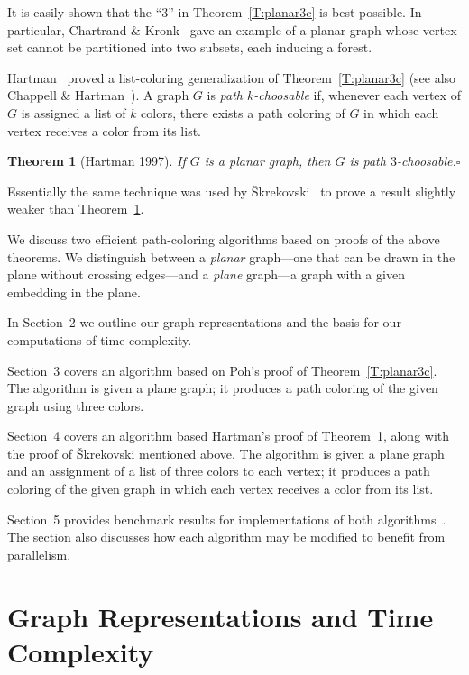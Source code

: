 \documentclass[12pt,letterpaper]{article}
\theoremstyle{plain}
\newtheorem{theorem}[lemma]{Theorem}         %
\theoremstyle{definition}
\theoremstyle{break}
\newcommand{\ggcqedsymbol}{$\square$}
\newcommand{\ggcqed}{\hbox{}\nobreak\hbox{\quad\ggcqedsymbol}}
\newcommand{\ggcnopf}{\ggcqed}
\newcommand{\defterm}[1]{\emph{#1}} %
\begin{document}
It is easily shown that the ``$3$'' in Theorem~\ref{T:planar3c}
is best possible.
In particular, Chartrand \& Kronk~\cite[Section~3]{ChKr1969}
gave an example of a planar graph whose vertex set cannot be partitioned
into two subsets, each inducing a forest.

Hartman~\cite[Thm.~4.1]{Har1997}
proved a list-coloring generalization of Theorem~\ref{T:planar3c}
(see also Chappell \& Hartman~\cite[Thm.~2.1]{ChHa2017prep}).
A graph $G$ is \defterm{path $k$-choosable} if,
whenever each vertex of $G$ is assigned a list of $k$ colors,
there exists a path coloring of $G$ in which each vertex receives
a color from its list.

\begin{theorem}[Hartman 1997]\label{T:planar3}
If $G$ is a planar graph,
then $G$ is path $3$-choosable.\ggcnopf\end{theorem}

Essentially the same technique was used by
\v{S}krekovski~\cite[Thm.~2.2b]{Skr1999}
to prove a result slightly weaker than Theorem~\ref{T:planar3}.


\medskip

We discuss two efficient path-coloring algorithms
based on proofs of the above theorems.
We distinguish between a \defterm{planar} graph---one that
can be drawn in the plane without crossing edges---and
a \defterm{plane} graph---a graph with a given embedding
in the plane.

In Section~2 we outline our graph representations
and the basis for our computations of time complexity.

Section~3 covers an algorithm
based on Poh's proof of Theorem~\ref{T:planar3c}.
The algorithm is given a plane graph;
it produces a path coloring of the given graph
using three colors.

Section~4 covers an algorithm
based Hartman's proof of Theorem~\ref{T:planar3},
along with the proof of \v{S}krekovski mentioned above.
The algorithm is given a plane graph
and an assignment of a list of three colors to each vertex;
it produces a path coloring of the given graph
in which each vertex receives a color from its list.

Section~5 provides benchmark results for implementations of both
algorithms~\cite{Bro2017}. The section also
discusses how each algorithm may be modified to benefit from parallelism.

\section{Graph Representations and Time Complexity}
\end{document}
